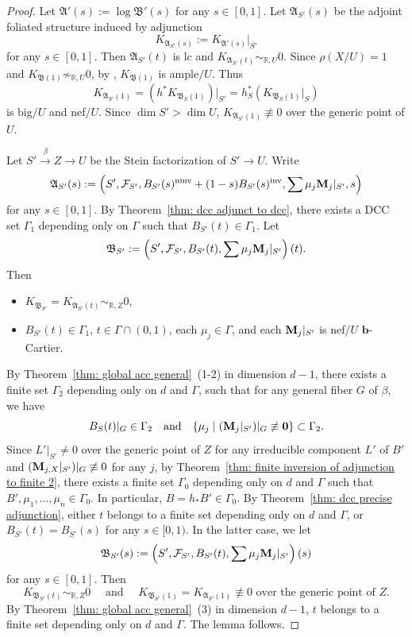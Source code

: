 \documentclass[11pt,reqno]{amsart}
\numberwithin{equation}{section}
\newcommand{\bb}{\bm{b}}
\newcommand{\Mm}{{\bf{M}}}
\newcommand{\ninv}{\operatorname{ninv}}
\newcommand{\inv}{\operatorname{inv}}
\newcommand{\Aa}{{\mathfrak{A}}}
\newcommand{\Bb}{{\mathfrak{B}}}
\newcommand{\Ff}{\mathcal{F}}
\newcommand{\Ii}{\Gamma}
\theoremstyle{definition}
\begin{document}
\begin{proof}
Let $\Aa'(s):=\log\Bb'(s)$ for any $s\in [0,1]$. Let $\Aa_{S'}(s)$ be the adjoint foliated structure induced by adjunction
$$K_{\Aa_{S'}(s)}:=K_{\Aa'(s)}|_{S'}$$
for any $s\in [0,1]$. Then $\Aa_{S'}(t)$ is lc and $K_{\Aa_{S'}(t)}\sim_{\mathbb R,U}0$. Since $\rho(X/U)=1$ and $K_{\Bb(1)}\not\sim_{\mathbb R,U}0$, by \cite[Theorem~5.1]{Cas+25a}, $K_{\Bb(1)}$ is ample$/U$. Thus
$$K_{\Aa_{S'}(1)}=\left(h^*K_{\Bb_S(1)}\right)|_{S'}=h_S^*(K_{\Bb_S(1)}|_S)$$ is big$/U$ and nef$/U$. Since $\dim S'>\dim U$, $K_{\Aa_{S'}(1)}\not\equiv 0$ over the generic point of $U$.

Let $S'\xrightarrow{\beta} Z\rightarrow U$ be the Stein factorization of $S'\rightarrow U$. Write
$$\Aa_{S'}(s):=\left(S',\Ff_{S'},B_{S'}(s)^{\ninv}+(1-s)B_{S'}(s)^{\inv},\sum \mu_j\Mm_j|_{S'},s\right)$$
for any $s\in [0,1]$. By Theorem~\ref{thm: dcc adjunct to dcc}, there exists a DCC set $\Ii_1$ depending only on $\Ii$ such that $B_{S'}(t)\in\Ii_1$. Let
$$\Bb_{S'}:=\left(S',\Ff_{S'},B_{S'}(t),\sum \mu_j\Mm_j|_{S'}\right)(t).$$
Then
\begin{itemize}
    \item $K_{\Bb_{S'}}=K_{\Aa_{S'}(t)}\sim_{\mathbb R,Z}0$,
    \item $B_{S'}(t)\in\Ii_1$, $t\in\Ii\cap (0,1)$, each $\mu_j\in\Ii$, and each $\Mm_j|_{S'}$ is nef$/U$ $\bb$-Cartier.
\end{itemize}
By Theorem~\ref{thm: global acc general}~(1-2) in dimension $d-1$, there exists a finite set $\Ii_2$ depending only on $d$ and $\Ii$, such that for any general fiber $G$ of $\beta$, we have 
$$B_S(t)|_G\in\Ii_2\quad \text{and}\quad \{\mu_j\mid (\Mm_j|_{S'})|_G\not\equiv\bm{0}\}\subset\Ii_2.$$ Since $L'|_{S'}\neq0$ over the generic point of $Z$ for any irreducible component $L'$ of $B'$ and $(\Mm_{j,X}|_{S'})|_G\not\equiv 0$ for any $j$, by Theorem~\ref{thm: finite inversion of adjunction to finite 2}, there exists a finite set $\Ii_0$ depending only on $d$ and $\Ii$ such that $B',\mu_1,\dots,\mu_n\in\Ii_0$. In particular, $B=h_*B'\in\Ii_0$. By Theorem~\ref{thm: dcc precise adjunction}, either $t$ belongs to a finite set depending only on $d$ and $\Ii$, or $B_{S'}(t)=B_{S'}(s)$ for any $s\in [0,1)$. In the latter case, we let 
$$\Bb_{S'}(s):=\left(S',\Ff_{S'},B_{S'}(t),\sum \mu_j\Mm_j|_{S'}\right)(s)$$
for any $s\in [0,1]$. Then
$$K_{\Bb_{S'}(t)}\sim_{\mathbb R,Z}0\quad \text{ and }\quad K_{\Bb_{S'}(1)}=K_{\Aa_{S'}(1)}\not\equiv 0\text{ over the generic point of }Z.$$
By Theorem~\ref{thm: global acc general}~(3) in dimension $d-1$, $t$ belongs to a finite set depending only on $d$ and $\Ii$. The lemma follows.
\end{proof}
\end{document}
